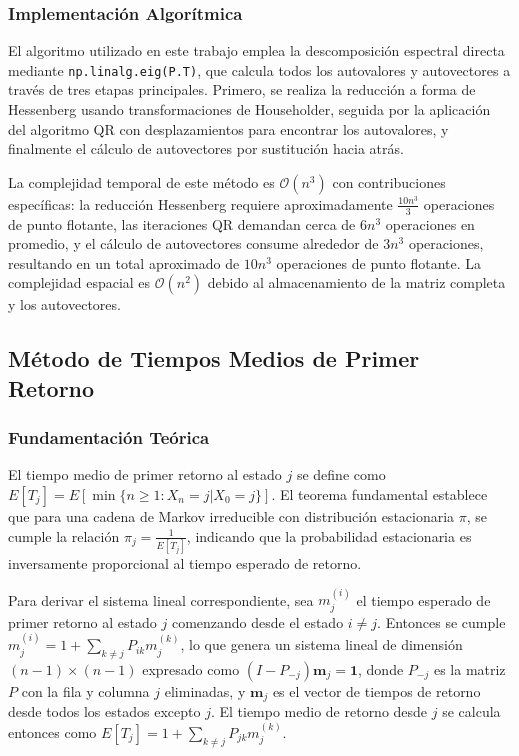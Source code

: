 \subsubsection{Implementación Algorítmica}

El algoritmo utilizado en este trabajo emplea la descomposición espectral directa mediante \texttt{np.linalg.eig(P.T)}, que calcula todos los autovalores y autovectores a través de tres etapas principales. Primero, se realiza la reducción a forma de Hessenberg usando transformaciones de Householder, seguida por la aplicación del algoritmo QR con desplazamientos para encontrar los autovalores, y finalmente el cálculo de autovectores por sustitución hacia atrás.

La complejidad temporal de este método es $\mathcal{O}(n^3)$ con contribuciones específicas: la reducción Hessenberg requiere aproximadamente $\frac{10n^3}{3}$ operaciones de punto flotante, las iteraciones QR demandan cerca de $6n^3$ operaciones en promedio, y el cálculo de autovectores consume alrededor de $3n^3$ operaciones, resultando en un total aproximado de $10n^3$ operaciones de punto flotante. La complejidad espacial es $\mathcal{O}(n^2)$ debido al almacenamiento de la matriz completa y los autovectores.

\subsection{Método de Tiempos Medios de Primer Retorno}

\subsubsection{Fundamentación Teórica}

El tiempo medio de primer retorno al estado $j$ se define como $E[T_j] = E[\min\{n \geq 1 : X_n = j | X_0 = j\}]$. El teorema fundamental establece que para una cadena de Markov irreducible con distribución estacionaria $\pi$, se cumple la relación $\pi_j = \frac{1}{E[T_j]}$, indicando que la probabilidad estacionaria es inversamente proporcional al tiempo esperado de retorno.

Para derivar el sistema lineal correspondiente, sea $m_j^{(i)}$ el tiempo esperado de primer retorno al estado $j$ comenzando desde el estado $i \neq j$. Entonces se cumple $m_j^{(i)} = 1 + \sum_{k \neq j} P_{ik} m_j^{(k)}$, lo que genera un sistema lineal de dimensión $(n-1) \times (n-1)$ expresado como $(I - P_{-j}) \mathbf{m}_j = \mathbf{1}$, donde $P_{-j}$ es la matriz $P$ con la fila y columna $j$ eliminadas, y $\mathbf{m}_j$ es el vector de tiempos de retorno desde todos los estados excepto $j$. El tiempo medio de retorno desde $j$ se calcula entonces como $E[T_j] = 1 + \sum_{k \neq j} P_{jk} m_j^{(k)}$.

